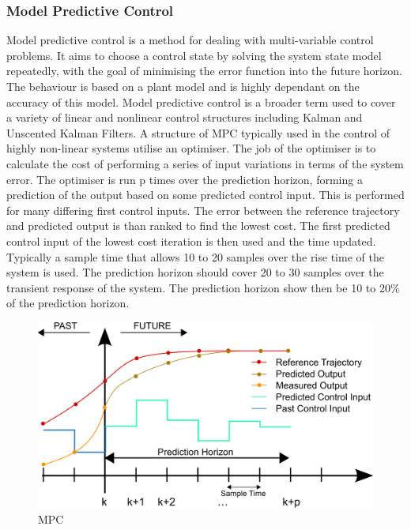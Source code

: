\documentclass[11pt,a4paper]{article}
\begin{document}
\subsubsection{Model Predictive Control}
\label{sub:model_predictive_control}
Model predictive control is a method for dealing with multi-variable control problems. It aims to choose a control state by solving the system state model repeatedly, with the goal of minimising the error function into the future horizon. The behaviour is based on a plant model and is highly dependant on the accuracy of this model. Model predictive control is a broader term used to cover a variety of linear and nonlinear control structures including Kalman and Unscented Kalman Filters.\newline
A structure of MPC typically used in the control of highly non-linear systems utilise an optimiser. The job of the optimiser is to calculate the cost of performing a series of input variations in terms of the system error. The optimiser is run p times over the prediction horizon, forming a prediction of the output based on some predicted control input. This is performed for many differing first control inputs. The error between the reference trajectory and predicted output is than ranked to find the lowest cost. The first predicted control input of the lowest cost iteration is then used and the time updated. Typically a sample time that allows 10 to 20 samples over the rise time of the system is used. The prediction horizon should cover 20 to 30 samples over the transient response of the system. The prediction horizon show then be 10 to 20\% of the prediction horizon.\newline

\begin{figure}[!hbt]
    \centering
    \includegraphics[scale=0.15]{MPC.png}
    \caption{MPC}
    \label{fig:mpc_chart}
\end{figure}
\end{document}
